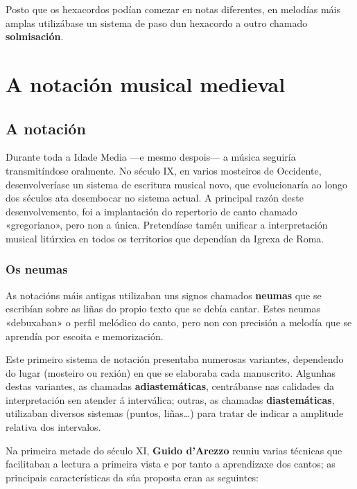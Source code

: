 \documentclass[a4paper, twoside]{templates/ociamthesis}
\begin{document}
Posto que os hexacordos podían comezar en notas diferentes, en melodías máis amplas utilizábase un sistema de paso dun hexacordo a outro chamado \textbf{solmisación}.

\hypertarget{a-notaciuxf3n-musical-medieval}{%
\section*{A notación musical medieval}\label{a-notaciuxf3n-musical-medieval}}

\hypertarget{a-notaciuxf3n}{%
\subsection{A notación}\label{a-notaciuxf3n}}

Durante toda a Idade Media ---e mesmo despois--- a música seguiría transmitíndose oralmente. No século IX, en varios mosteiros de Occidente, desenvolveríase un sistema de escritura musical novo, que evolucionaría ao longo dos séculos ata desembocar no sistema actual. A principal razón deste desenvolvemento, foi a implantación do repertorio de canto chamado «gregoriano», pero non a única. Pretendíase tamén unificar a interpretación musical litúrxica en todos os territorios que dependían da Igrexa de Roma.

\hypertarget{os-neumas}{%
\subsubsection{Os neumas}\label{os-neumas}}

As notacións máis antigas utilizaban uns signos chamados \textbf{neumas} que se escribían sobre as liñas do propio texto que se debía cantar. Estes neumas «debuxaban» o perfil melódico do canto, pero non con precisión a melodía que se aprendía por escoita e memorización.

Este primeiro sistema de notación presentaba numerosas variantes, dependendo do lugar (mosteiro ou rexión) en que se elaboraba cada manuscrito. Algunhas destas variantes, as chamadas \textbf{adiastemáticas}, centrábanse nas calidades da interpretación sen atender á interválica; outras, as chamadas \textbf{diastemáticas}, utilizaban diversos sistemas (puntos, liñas\ldots) para tratar de indicar a amplitude relativa dos intervalos.

Na primeira metade do século XI, \textbf{Guido d'Arezzo} reuniu varias técnicas que facilitaban a lectura a primeira vista e por tanto a aprendizaxe dos cantos; as principais características da súa proposta eran as seguintes:
\end{document}
